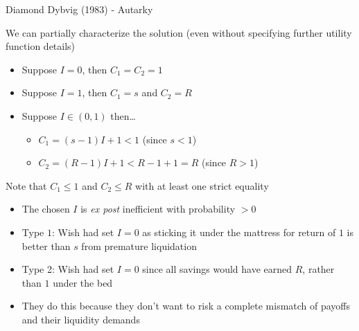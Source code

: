 

\begin{frame}{Diamond Dybvig (1983) - Autarky}

We can partially characterize the solution (even without specifying further utility function details)
	\begin{itemize}
	\item	Suppose $I = 0$, then $C_{1}=C_{2}=1$
	\item	Suppose $I = 1$, then $C_{1}=s$ and $C_{2}=R$
	\item	Suppose $I\in(0,1)$ then\ldots
		\begin{itemize}
		\item	$C_{1} = (s-1)I + 1 < 1$ (since $s<1$)
		\item	$C_{2} = (R-1)I + 1 < R - 1 + 1 = R$ (since $R>1$)
		\end{itemize}
	\end{itemize}
\vspace{2mm}
Note that $C_{1}\leq1$ and $C_{2}\leq R$ with at least one strict equality
	\begin{itemize}
	\item	The chosen $I$ is \emph{ex post} inefficient with probability $>0$
	\item	Type $1$: Wish had set $I=0$ as sticking it under the mattress for return of $1$ is better than $s$ from premature liquidation
	\item	Type 2: Wish had set $I=0$ since all savings would have earned $R$, rather than $1$ under the bed
	\item	They do this because they don't want to risk a complete mismatch of payoffs and their liquidity demands
	\end{itemize}
	
\end{frame}




